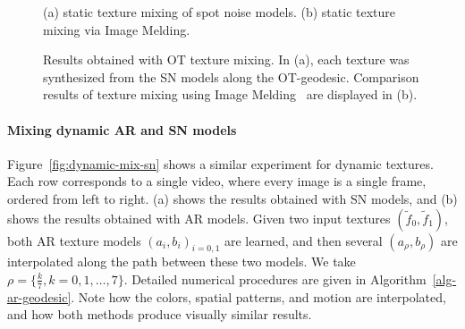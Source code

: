 \begin{figure}[ht!]
  \begin{center}
	(a) static texture mixing of spot noise models.
	(b) static texture mixing via Image Melding.
  	\end{center}
  \caption{Results obtained with OT texture mixing. In (a), each texture was synthesized from the SN models along the OT-geodesic. Comparison results of texture mixing using Image Melding~\cite{ImageMelding12} are displayed in (b).
  }
  \label{fig-OT-mixing-static}
\end{figure}



\paragraph{Mixing dynamic AR and SN  models}
Figure~\ref{fig:dynamic-mix-sn} shows a similar experiment for dynamic textures. 
Each row corresponds to a single video, where every image is a single frame, ordered from left to right. 
(a) shows the results obtained with SN models, and (b) shows the results obtained with AR models. Given two input textures $(\tilde f_0, \tilde f_1 )$, both AR texture models $(a_i, b_i)_{i=0,1}$ are learned, and then several $(a_{\rho}, b_{\rho})$ are interpolated along the path between these two models. We take $ \rho=\{ \frac{k}{7}, k=0,1,\ldots, 7 \}$. Detailed numerical procedures are given in Algorithm~\ref{alg-ar-geodesic}.
Note how the colors, spatial patterns, and motion are interpolated, and how both methods produce visually similar results.


